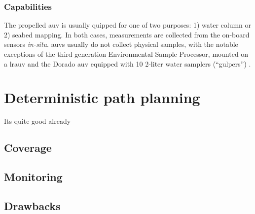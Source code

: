 \subsubsection{Capabilities}
The propelled \acrshort{auv} is usually quipped for one of two purposes: 1) water column or 2) seabed mapping. In both cases, measurements are collected from the on-board sensors \textit{in-situ}. \acrshort{auv}s usually do not collect physical samples, with the notable exceptions of the third generation Environmental Sample Processor, mounted on a \acrfull{lrauv} \cite{pargett2015development} and the Dorado \acrshort{auv}  equipped with 10 2-liter water samplers (“gulpers”) \cite{zhang2011peak}. 

\section{Deterministic path planning}
Its quite good already
\subsection{Coverage}
\subsection{Monitoring}
\subsection{Drawbacks}
